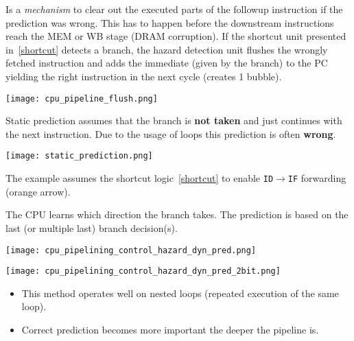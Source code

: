 \newpar{}

Is a \textit{mechanism} to clear out the executed parts of the followup instruction if the prediction was wrong. This has to happen before the downstream instructions reach the MEM or WB stage (DRAM corruption). If the shortcut unit presented in~\ref{shortcut} detects a branch, the hazard detection unit flushes the wrongly fetched instruction and adds the immediate (given by the branch) to the PC yielding the right instruction in the next cycle (creates 1 bubble).
\begin{center}
    \texttt{[image: cpu\_pipeline\_flush.png]}
\end{center}
\newpar{}

Static prediction assumes that the branch is \textbf{not taken} and just continues with the next instruction. Due to the usage of loops this prediction is often \textbf{wrong}.
\begin{center}
    \texttt{[image: static\_prediction.png]}
\end{center}
The example assumes the shortcut logic~\ref{shortcut} to enable \texttt{ID}$\to$\texttt{IF} forwarding (orange arrow).

\newpar{}

The CPU learns which direction the branch takes. The prediction is based on the last (or multiple last) branch decision(s). %
\begin{center}
    \texttt{[image: cpu\_pipelining\_control\_hazard\_dyn\_pred.png]}
\end{center}

\newpar{}
\begin{center}
    \texttt{[image: cpu\_pipelining\_control\_hazard\_dyn\_pred\_2bit.png]}
\end{center}

\begin{itemize}
    \item This method operates well on nested loops (repeated execution of the same loop).
    \item Correct prediction becomes more important the deeper the pipeline is.
\end{itemize}


